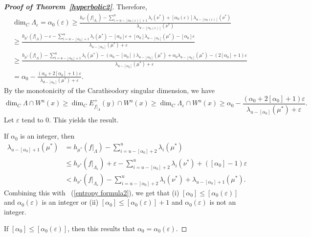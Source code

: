 \documentclass[11pt,a4paper]{amsart}
\theoremstyle{plain}
\theoremstyle{remark}
\begin{document}
\begin{proof}[\textbf{Proof of Theorem~\ref{hyperbolic2}}]
		Therefore,
		\begin{align*}
			&\dim_{C}\Lambda_{\varepsilon}=\alpha_{0}(\varepsilon)\geq\frac{h_{\nu^{\ast}}(f|_{\Lambda_{\varepsilon}})-\sum^{u}_{i=u-[\alpha_{0}(\varepsilon)]+1}\lambda_{i}(\nu^{\ast})+[\alpha_{0}(\varepsilon)]\lambda_{u-[\alpha_{0}(\varepsilon)]}(\nu^{\ast})}{\lambda_{u-[\alpha_{0}(\varepsilon)]}(\nu^{\ast})}\\
			&\geq\frac{h_{\mu^{\ast}}(f|_{\Lambda})-\varepsilon-\sum^{u}_{i=u-[\alpha_{0}]+1}\lambda_{i}(\mu^{\ast})-[\alpha_{0}]\varepsilon+[\alpha_{0}]\lambda_{u-[\alpha_{0}]}(\mu^{\ast})-[\alpha_{0}]\varepsilon}{\lambda_{u-[\alpha_{0}]}(\mu^{\ast})+\varepsilon}\\
			&\geq \frac{h_{\mu^{\ast}}(f|_{\Lambda})-\sum^{u}_{i=u-[\alpha_{0}]+1}\lambda_{i}(\mu^{\ast})-(\alpha_{0}-[\alpha_{0}])\lambda_{u-[\alpha_{0}]}(\mu^{\ast})+\alpha_{0}\lambda_{u-[\alpha_{0}]}(\mu^{\ast})-(2[\alpha_{0}]+1)\varepsilon}{\lambda_{u-[\alpha_{0}]}(\mu^{\ast})+\varepsilon}\\
			&=\alpha_{0}-\frac{(\alpha_{0}+2[\alpha_{0}]+1)\varepsilon}{\lambda_{d-[\alpha_{0}]}(\mu^{\ast})+\varepsilon}.
		\end{align*}
		By the monotonicity of the Carath$\acute{\text{e}}$odory singular dimension, we have $$\dim_{C}\Lambda\cap W^{u}(x)\geq \dim_{C} E^{+}_{f|_{\Lambda}}(y)\cap W^{u}(x)\geq \dim_{C}\Lambda_{\varepsilon}\cap W^{u}(x)\geq \alpha_{0}-\frac{(\alpha_{0}+2[\alpha_{0}]+1)\varepsilon}{\lambda_{u-[\alpha_{0}]}(\mu^{\ast})+\varepsilon}.$$ Let $\varepsilon$ tend to $0$. This yields the result.
		
		If $\alpha_{0}$ is  an integer, then
		\begin{align*}
			\lambda_{u-[\alpha_{0}]+1}(\mu^{\ast})&=h_{\mu^{\ast}}(f|_{\Lambda})-\sum^{u}_{i=u-[\alpha_{0}]+2}\lambda_{i}(\mu^{\ast})\\
			&\leq h_{\nu^{\ast}}(f|_{\Lambda_{\varepsilon}})+\varepsilon-\sum^{u}_{i=u-[\alpha_{0}]+2}\lambda_{i}(\nu^{\ast})+([\alpha_{0}]-1)\varepsilon\\
			&< h_{\nu^{\ast}}(f|_{\Lambda_{\varepsilon}})-\sum^{u}_{i=u-[\alpha_{0}]+2}\lambda_{i}(\nu^{\ast})+\lambda_{u-[\alpha_{0}]+1}(\mu^{\ast}).
		\end{align*}
		Combining this with ~(\ref{entropy formula2}), we get that (i) $[\alpha_{0}]\leq [\alpha_{0}(\varepsilon)]$ and $\alpha_{0}(\varepsilon)$ is  an integer or (ii) $[\alpha_{0}]\leq [\alpha_{0}(\varepsilon)]+1$ and $\alpha_{0}(\varepsilon)$ is not an integer.
		
		If $[\alpha_{0}]\leq [\alpha_{0}(\varepsilon)]$, then this results that $\alpha_{0}=\alpha_{0}(\varepsilon)$.
		

\end{proof}
\end{document}
